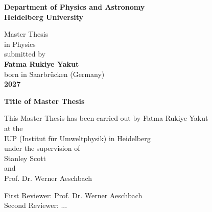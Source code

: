 \begin{titlepage}
\begin{center}
 
\Large\textbf{Department of Physics and Astronomy\\
Heidelberg University}

\vspace{13cm}

\normalsize
Master Thesis \\
in Physics\\
submitted by\\
\vspace{0.5cm}
\Large\textbf{Fatma Rukiye Yakut}\\
\normalsize
\vspace{0.5cm}
born in Saarbrücken (Germany)\\
\vspace{0.5cm}
\Large\textbf{2027}
\normalsize

\newpage



\Large\textbf{Title of Master Thesis}

\vspace{11cm}

\normalsize
This Master Thesis has been carried out by Fatma Rukiye Yakut \\
at the\\
IUP (Institut für Umweltphysik) in Heidelberg\\
under the supervision of\\
Stanley Scott \\
and \\
Prof. Dr. Werner Aeschbach


\vfill
\end{center}

First Reviewer: Prof. Dr. Werner Aeschbach \\
Second Reviewer: ...

\end{titlepage}
